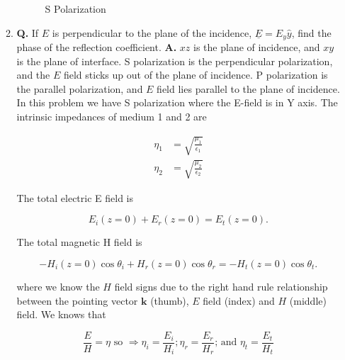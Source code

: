 \documentclass[main.tex]{subfiles}
\begin{document}
\begin{enumerate}
\begin{enumerate}
        \begin{figure}
        \centering{}
        \caption{S Polarization}
        \label{fig:12s_a}
        \end{figure}
        
        \item \textbf{Q.} If \underline{$E$} is perpendicular to the plane of the incidence, $\underline{E} = E_y \hat{y}$, find the phase of the reflection coefficient. \textbf{A.} $xz$ is the plane of incidence, and $xy$ is the plane of interface. S polarization is the perpendicular polarization, and the $E$ field sticks up out of the plane of incidence. P polarization is the parallel polarization, and $E$ field lies parallel to the plane of incidence. In this problem we have S polarization where the E-field is in Y axis. The intrinsic impedances of medium 1 and 2 are

        $$
        \begin{aligned}
        \eta_1 & =\sqrt{\frac{\mu_1}{\epsilon_1}} \\
        \eta_2 & =\sqrt{\frac{\mu_2}{\epsilon_2}}
        \end{aligned}
        $$
        
        The total electric E field is
        
        $$
        E_i(z=0)+E_r(z=0)=E_{t}(z=0).
        $$
        
        The total magnetic H field is
        
        $$
        -H_i(z=0) \cos \theta_i+ H_r(z=0) \cos \theta_r = -H_t(z=0) \cos \theta_t.
        $$
        
         where we know the $H$ field signs due to the right hand rule relationship between the pointing vector $\mathbf{k}$ (thumb), $E$ field (index) and $H$ (middle) field. We knows that
        
        $$
        \frac{E}{H}=\eta \text { so } \Rightarrow \eta_i=\frac{E_i}{H_i} ; \eta_r=\frac{E_r}{H_r} \text {; and } \eta_t=\frac{E_t}{H_t}
        $$
        

\end{enumerate}
\end{enumerate}
\end{document}
